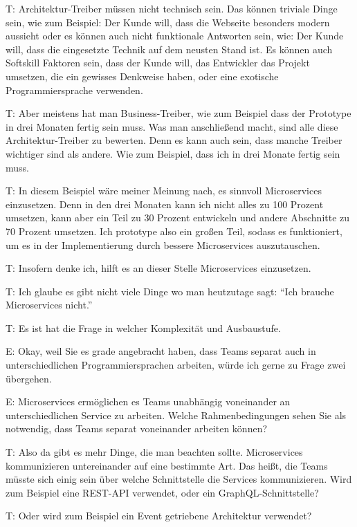 T: Architektur-Treiber müssen nicht technisch sein. Das können triviale Dinge sein, wie zum Beispiel: Der Kunde will, dass die Webseite besonders modern aussieht oder es können auch nicht funktionale Antworten sein, wie: Der Kunde will, dass die eingesetzte Technik auf dem neusten Stand ist. Es können auch Softskill Faktoren sein, dass der Kunde will, das Entwickler das Projekt umsetzen, die ein gewisses Denkweise haben, oder eine exotische Programmiersprache verwenden. 

\label{appendix:t-15}
T: Aber meistens hat man Business-Treiber, wie zum Beispiel dass der Prototype in drei Monaten fertig sein muss. Was man anschließend macht, sind alle diese Architektur-Treiber zu bewerten. Denn es kann auch sein, dass manche Treiber wichtiger sind als andere. Wie zum Beispiel, dass ich in drei Monate fertig sein muss. 

\label{appendix:t-16}
T: In diesem Beispiel wäre meiner Meinung nach, es sinnvoll Microservices einzusetzen. Denn in den drei Monaten kann ich nicht alles zu 100 Prozent umsetzen, kann aber ein Teil zu 30 Prozent entwickeln und andere Abschnitte zu 70 Prozent umsetzen. Ich prototype also ein großen Teil, sodass es funktioniert, um es in der Implementierung durch bessere Microservices auszutauschen. 

T: Insofern denke ich, hilft es an dieser Stelle Microservices einzusetzen.

\label{appendix:t-17}
T: Ich glaube es gibt nicht viele Dinge wo man heutzutage sagt: “Ich brauche Microservices nicht.”

\label{appendix:t-18}
T: Es ist hat die Frage in welcher Komplexität und Ausbaustufe.

E: Okay, weil Sie es grade angebracht haben, dass Teams separat auch in unterschiedlichen Programmiersprachen arbeiten, würde ich gerne zu Frage zwei übergehen.

E: Microservices ermöglichen es Teams unabhängig voneinander an unterschiedlichen Service zu arbeiten. Welche Rahmenbedingungen sehen Sie als notwendig, dass Teams separat voneinander arbeiten können?

\label{appendix:t-19}
T: Also da gibt es mehr Dinge, die man beachten sollte. Microservices kommunizieren untereinander auf eine bestimmte Art. Das heißt, die Teams müsste sich einig sein über welche Schnittstelle die Services kommunizieren. Wird zum Beispiel eine REST-API verwendet, oder ein GraphQL-Schnittstelle?
 
 \label{appendix:t-20}
T: Oder wird zum Beispiel ein Event getriebene Architektur verwendet?

